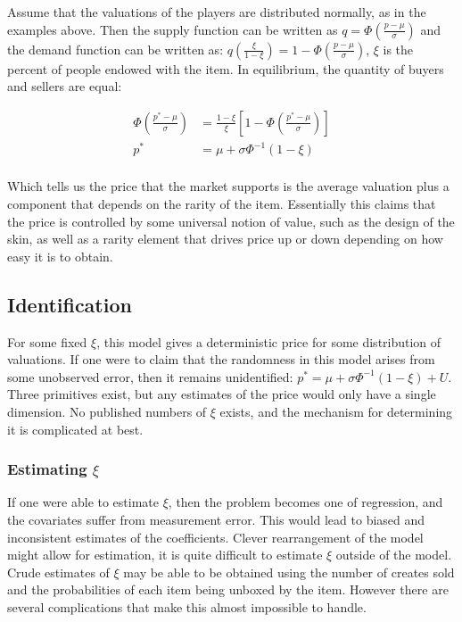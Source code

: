 \documentclass[12pt, letterpaper]{paper}
\begin{document}
Assume that the valuations of the players are distributed
normally, as in the examples above. Then the supply function can be
written as $q = \Phi \left ( \frac{ p - \mu }{\sigma} \right )$ and the demand
function can be written as: $q \left ( \frac{\xi}{1-\xi} \right ) = 1 - \Phi \left ( \frac{
p - \mu }{ \sigma } \right )$, $\xi$ is the percent of people endowed with
the item. In equilibrium, the quantity of buyers and sellers are
equal:

\begin{align*}
\Phi \left ( \frac{ p^* - \mu }{\sigma} \right ) &= \frac{1-\xi}{\xi} \left [ 1 - \Phi \left
( \frac{ p^* - \mu }{\sigma} \right ) \right ]\\
p^* &= \mu + \sigma \Phi^{-1} ( 1- \xi )\\
\end{align*}

Which tells us the price that the market supports is the average
valuation plus a component that depends on the rarity of the
item. Essentially this claims that the price is controlled by some
universal notion of value, such as the design of the skin, as well as
a rarity element that drives price up or down depending on how easy it
is to obtain.

\subsection{Identification}
\label{sec-2-2}
For some fixed $\xi$, this model gives a deterministic price for some
distribution of valuations. If one were to claim that the randomness in
this model arises from some unobserved error, then it remains
unidentified: $p^* = \mu + \sigma \Phi^{-1} ( 1 - \xi) +
U$. Three primitives exist, but any estimates of the price would
only have a single dimension. No published numbers of $\xi$ exists, and
the mechanism for determining it is complicated at best.

\subsubsection{Estimating $\xi$}
\label{sec-2-2-1}

If one were able to estimate $\xi$, then the problem becomes one of
regression, and the covariates suffer from measurement error. This
would lead to biased and inconsistent estimates of the
coefficients. Clever rearrangement of the model might allow for
estimation, it is quite difficult to estimate $\xi$ outside of the
model. Crude estimates of $\xi$ may be able to be obtained using the
number of creates sold and the probabilities of each item being
unboxed by the item. However there are several complications that make
this almost impossible to handle.
\end{document}
